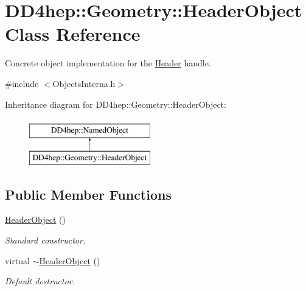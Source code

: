 \hypertarget{class_d_d4hep_1_1_geometry_1_1_header_object}{}\section{D\+D4hep\+:\+:Geometry\+:\+:Header\+Object Class Reference}
\label{class_d_d4hep_1_1_geometry_1_1_header_object}


Concrete object implementation for the \hyperlink{class_d_d4hep_1_1_geometry_1_1_header}{Header} handle.  




{\ttfamily \#include $<$Objects\+Interna.\+h$>$}

Inheritance diagram for D\+D4hep\+:\+:Geometry\+:\+:Header\+Object\+:\begin{figure}[H]
\begin{center}
\leavevmode
\includegraphics[height=2.000000cm]{class_d_d4hep_1_1_geometry_1_1_header_object}
\end{center}
\end{figure}
\subsection*{Public Member Functions}
\begin{DoxyCompactItemize}
\item 
\hyperlink{class_d_d4hep_1_1_geometry_1_1_header_object_a5eed0824bd2e8fc9bdc3a83741bea1d0}{Header\+Object} ()
\begin{DoxyCompactList}\small\item\em Standard constructor. \end{DoxyCompactList}\item 
virtual \hyperlink{class_d_d4hep_1_1_geometry_1_1_header_object_a85f2f362b11a0ebb206e118489a3810f}{$\sim$\+Header\+Object} ()
\begin{DoxyCompactList}\small\item\em Default destructor. \end{DoxyCompactList}\end{DoxyCompactItemize}
